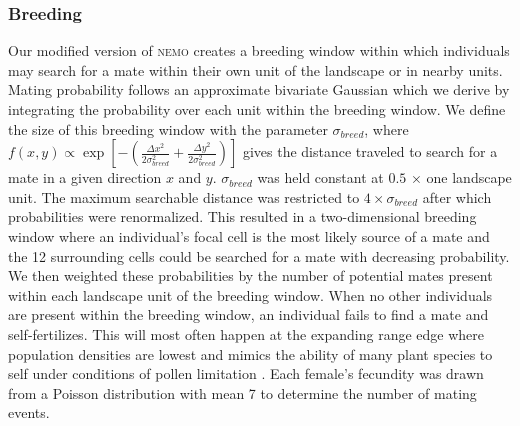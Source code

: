 \subsubsection{Breeding}
Our modified version of \textsc{nemo} creates a breeding window within which individuals may search for a mate within their own unit of the landscape or in nearby units. Mating probability follows an approximate bivariate Gaussian which we derive by integrating the probability over each unit within the breeding window. We define the size of this breeding window with the parameter $\sigma_{breed}$, where $f(x,y) \propto \exp{[-(\frac{\Delta x^2}{2\sigma_{breed}^2}+\frac{\Delta y^2}{2\sigma_{breed}^2})]}$ gives the distance traveled to search for a mate in a given direction $x$ and $y$. %
$\sigma_{breed}$ was held constant at $0.5$ $\times$ one landscape unit.
The maximum searchable distance was restricted to $4 \times \sigma_{breed}$ after which probabilities were renormalized. This resulted in a two-dimensional breeding window where an individual's focal cell is the most likely source of a mate and the 12 surrounding cells could be searched for a mate with decreasing probability. We then weighted these probabilities by the number of potential mates present within each landscape unit of the breeding window. 
When no other individuals are present within the breeding window, an individual fails to find a mate and self-fertilizes. This will most often happen at the expanding range edge where population densities are lowest and mimics the ability of many plant species to self under conditions of pollen limitation \citep{Hargreaves:2014}. Each female's fecundity was drawn from a Poisson distribution with mean 7 to determine the number of mating events. 

